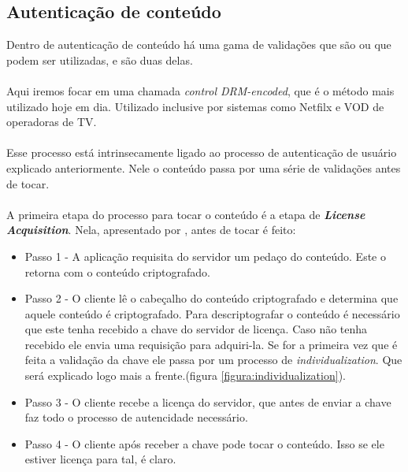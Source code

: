 \subsection{Autentica\c{c}\~ao de conte\'udo}
\label{subsection:autenticacao_conteudo}
Dentro de autentica\c{c}\~ao de conte\'udo h\'a uma gama de valida\c{c}\~oes que s\~ao ou que podem ser utilizadas, \cite{wein2012content} e \cite{leighton2007html} s\~ao duas delas.
\paragraph{}
Aqui iremos focar em uma chamada \textit{control DRM-encoded}, que \'e o m\'etodo mais utilizado hoje em dia. Utilizado inclusive por sistemas como Netfilx e VOD de operadoras de TV.
\paragraph{}
Esse processo est\'a intrinsecamente ligado ao processo de autentica\c{c}\~ao de usu\'ario explicado anteriormente. Nele o conte\'udo passa por uma s\'erie de valida\c{c}\~oes antes de tocar.
\paragraph{}
A primeira etapa do processo para tocar o conte\'udo \'e a etapa de \textbf{\textit{License Acquisition}}. Nela, apresentado por \cite{pomelo2009analysis}, antes de tocar \'e feito:
\begin{itemize}
\item Passo 1 -  A aplica\c{c}\~ao requisita do servidor um peda\c{c}o do conte\'udo. Este o retorna com o conte\'udo criptografado.
\item Passo 2 - O cliente l\^e o cabe\c{c}alho do conte\'udo criptografado e determina que aquele conte\'udo \'e criptografado. Para descriptografar o conte\'udo \'e necess\'ario que este tenha recebido a chave do servidor de licen\c{c}a. Caso n\~ao tenha recebido ele envia uma requisi\c{c}\~ao para adquiri-la. Se for a primeira vez que \'e feita a valida\c{c}\~ao da chave ele passa por um processo de \textit{individualization}. Que ser\'a explicado logo mais a frente.(figura \ref{figura:individualization}).
\item Passo 3 - O cliente recebe a licen\c{c}a do servidor, que antes de enviar a chave faz todo o processo de autencidade necess\'ario.
\item Passo 4 - O cliente ap\'os receber a chave pode tocar o conte\'udo. Isso se ele estiver licen\c{c}a para tal, \'e claro.
\end{itemize}

